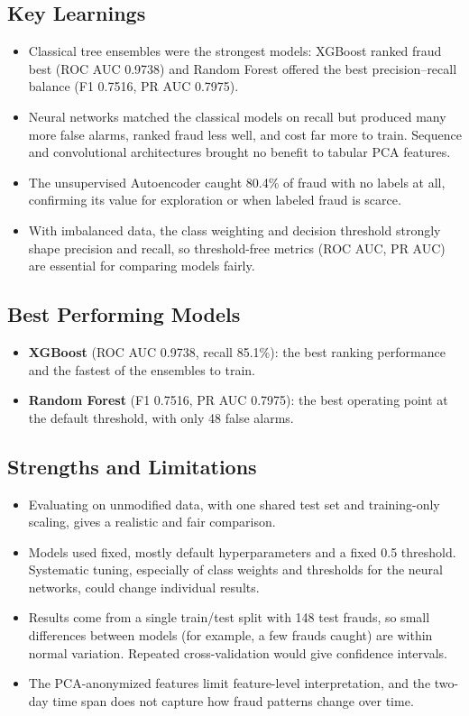 \documentclass[journal]{IEEEtran}
\begin{document}
\subsection{Key Learnings}
\begin{itemize}
  \item Classical tree ensembles were the strongest models: XGBoost ranked fraud best (ROC AUC 0.9738) and Random Forest offered the best precision--recall balance (F1 0.7516, PR AUC 0.7975).
  \item Neural networks matched the classical models on recall but produced many more false alarms, ranked fraud less well, and cost far more to train. Sequence and convolutional architectures brought no benefit to tabular PCA features.
  \item The unsupervised Autoencoder caught 80.4\% of fraud with no labels at all, confirming its value for exploration or when labeled fraud is scarce.
  \item With imbalanced data, the class weighting and decision threshold strongly shape precision and recall, so threshold-free metrics (ROC AUC, PR AUC) are essential for comparing models fairly.
\end{itemize}

\subsection{Best Performing Models}
\begin{itemize}
  \item \textbf{XGBoost} (ROC AUC 0.9738, recall 85.1\%): the best ranking performance and the fastest of the ensembles to train.
  \item \textbf{Random Forest} (F1 0.7516, PR AUC 0.7975): the best operating point at the default threshold, with only 48 false alarms.
\end{itemize}

\subsection{Strengths and Limitations}
\begin{itemize}
  \item Evaluating on unmodified data, with one shared test set and training-only scaling, gives a realistic and fair comparison.
  \item Models used fixed, mostly default hyperparameters and a fixed 0.5 threshold. Systematic tuning, especially of class weights and thresholds for the neural networks, could change individual results.
  \item Results come from a single train/test split with 148 test frauds, so small differences between models (for example, a few frauds caught) are within normal variation. Repeated cross-validation would give confidence intervals.
  \item The PCA-anonymized features limit feature-level interpretation, and the two-day time span does not capture how fraud patterns change over time.
\end{itemize}
\end{document}

